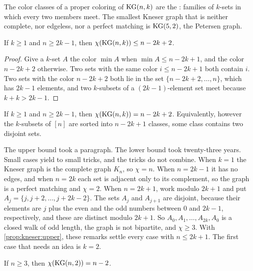 \begin{refsection}
The color classes of a proper coloring of $\mathrm{KG}(n,k)$ are the : families of $k$-sets in which every two members meet. The smallest Kneser graph that is neither complete, nor edgeless, nor a perfect matching is $\mathrm{KG}(5,2)$, the Petersen graph.

\begin{proposition}\label{prop:kneser:upper}
If $k\ge1$ and $n\ge2k-1$, then $\chi(\mathrm{KG}(n,k))\le n-2k+2$.
\end{proposition}

\begin{proof}
Give a $k$-set $A$ the color $\min A$ when $\min A\le n-2k+1$, and the color $n-2k+2$ otherwise. Two sets with the same color $i\le n-2k+1$ both contain $i$. Two sets with the color $n-2k+2$ both lie in the set $\{n-2k+2,\dots,n\}$, which has $2k-1$ elements, and two $k$-subsets of a $(2k-1)$-element set meet because $k+k>2k-1$.
\end{proof}

\begin{conjecture}\label{conj:kneser:kneser}
If $k\ge1$ and $n\ge2k-1$, then $\chi(\mathrm{KG}(n,k))=n-2k+2$. Equivalently, however the $k$-subsets of $[n]$ are sorted into $n-2k+1$ classes, some class contains two disjoint sets.
\end{conjecture}

The upper bound took a paragraph. The lower bound took twenty-three years. Small cases yield to small tricks, and the tricks do not combine. When $k=1$ the Kneser graph is the complete graph $K_n$, so $\chi=n$. When $n=2k-1$ it has no edges, and when $n=2k$ each set is adjacent only to its complement, so the graph is a perfect matching and $\chi=2$. When $n=2k+1$, work modulo $2k+1$ and put $A_j=\{j,j+2,\dots,j+2k-2\}$. The sets $A_j$ and $A_{j+1}$ are disjoint, because their elements are $j$ plus the even and the odd numbers between $0$ and $2k-1$, respectively, and these are distinct modulo $2k+1$. So $A_0,A_1,\dots,A_{2k},A_0$ is a closed walk of odd length, the graph is not bipartite, and $\chi\ge3$. With \cref{prop:kneser:upper}, these remarks settle every case with $n\le2k+1$. The first case that needs an idea is $k=2$.

\begin{proposition}\label{prop:kneser:k2}
If $n\ge3$, then $\chi(\mathrm{KG}(n,2))=n-2$.
\end{proposition}


\end{refsection}
